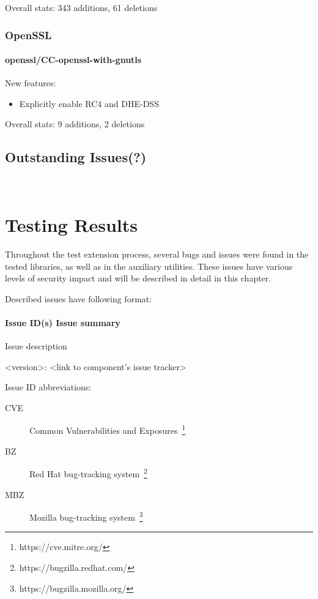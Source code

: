     Overall stats: 343 additions, 61 deletions

\subsection{OpenSSL}
\subsubsection{openssl/CC-openssl-with-gnutls}
    New features:
    \begin{itemize}
        \item Explicitly enable RC4 and DHE-DSS
    \end{itemize}

    Overall stats: 9 additions, 2 deletions

\section{Outstanding Issues(?)}
     \\

\chapter {Testing Results} \label{chap:testing_results}
    Throughout the test extension process, several bugs and issues were found
    in the tested libraries, as well as in the auxiliary utilities. These
    issues have various levels of security impact and will be described in
    detail in this chapter.

    \bigskip\noindent Described issues have following format:

    \subsubsection*{Issue ID(s)  \newline Issue summary}
    Issue description

    \medskip\noindent <version>: <link to component's issue tracker>

    \bigskip\noindent Issue ID abbreviations:
    \begin{description}
        \item[CVE] Common Vulnerabilities and Exposures~\footnote{https://cve.mitre.org/}
        \item[BZ] Red Hat bug-tracking system~\footnote{https://bugzilla.redhat.com/}
        \item[MBZ] Mozilla bug-tracking system~\footnote{https://bugzilla.mozilla.org/}
    \end{description}

